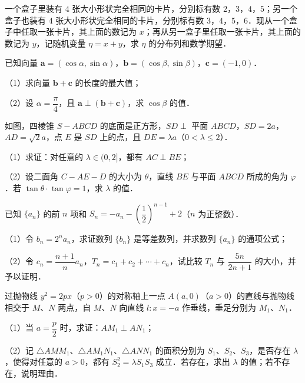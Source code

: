 \begin{question}
一个盒子里装有 $4$ 张大小形状完全相同的卡片，分别标有数 $2$，$3$，$4$，$5$；另一个盒子也装有 $4$ 张大小形状完全相同的卡片，分别标有数 $3$，$4$，$5$，$6$．现从一个盒子中任取一张卡片，其上面的数记为 $x$；再从另一盒子里任取一张卡片，其上面的数记为 $y$，记随机变量 $\eta=x+y$，求 $\eta$ 的分布列和数学期望．

\end{question}
\begin{question}
已知向量 $\boldsymbol a=(\cos\alpha,\sin\alpha)$，$\boldsymbol b=(\cos\beta,\sin\beta)$，$\boldsymbol c=(-1,0)$．

（1）求向量 $\boldsymbol b+\boldsymbol c$ 的长度的最大值；

（2）设 $\alpha=\dfrac\pi4$，且 $\boldsymbol a\perp(\boldsymbol b+\boldsymbol c)$，求 $\cos\beta$ 的值．

\Needspace{0.4\textheight}
\end{question}
\begingroup
\renewenvironment{question}{\Needspace{0.5\textheight}}{}
\begin{question}
如图，四棱锥 $S-ABCD$ 的底面是正方形，$SD\perp$ 平面 $ABCD$，$SD=2a$，$AD=\sqrt2a$，点 $E$ 是 $SD$ 上的点，且 $DE=\lambda a$（$0<\lambda\leqslant2$）．

（1）求证：对任意的 $\lambda\in(0,2]$，都有 $AC\perp BE$；

（2）设二面角 $C-AE-D$ 的大小为 $\theta$，直线 $BE$ 与平面 $ABCD$ 所成的角为 $\varphi$．若 $\tan\theta\cdot\tan\varphi=1$，求 $\lambda$ 的值．
\nopagebreak[4]
\begin{center}\end{center}
\nopagebreak[4]
\end{question}
\endgroup
\begin{question}
已知 $\{a_n\}$ 的前 $n$ 项和 $S_n=-a_n-\left(\dfrac12\right)^{n-1}+2$（$n$ 为正整数）．

（1）令 $b_n=2^na_n$，求证数列 $\{b_n\}$ 是等差数列，并求数列 $\{a_n\}$ 的通项公式；

（2）令 $c_n=\dfrac{n+1}{n}a_n$，$T_n=c_1+c_2+\cdots+c_n$，试比较 $T_n$ 与 $\dfrac{5n}{2n+1}$ 的大小，并予以证明．

\end{question}
\begin{question}
过抛物线 $y^2=2px$（$p>0$）的对称轴上一点 $A(a,0)$（$a>0$）的直线与抛物线相交于 $M$、$N$ 两点，自 $M$、$N$ 向直线 $l:x=-a$ 作垂线，垂足分别为 $M_1$、$N_1$．

（1）当 $a=\dfrac p2$ 时，求证：$AM_1\perp AN_1$；

（2）记 $\triangle AMM_1$、$\triangle AM_1N_1$、$\triangle ANN_1$ 的面积分别为 $S_1$、$S_2$、$S_3$，是否存在 $\lambda$，使得对任意的 $a>0$，都有 $S_2^2=\lambda S_1S_3$ 成立．若存在，求出 $\lambda$ 的值；若不存在，说明理由．

\end{question}
